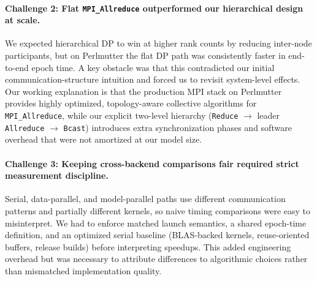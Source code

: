 \documentclass[11pt]{article}
\begin{document}
\paragraph{Challenge 2: Flat \texttt{MPI\_Allreduce} outperformed our hierarchical design at scale.}
We expected hierarchical DP to win at higher rank counts by reducing
inter-node participants, but on Perlmutter the flat DP path was consistently
faster in end-to-end epoch time. A key obstacle was that this contradicted our
initial communication-structure intuition and forced us to revisit system-level
effects. Our working explanation is that the production MPI stack on
Perlmutter provides highly optimized, topology-aware collective algorithms for
\texttt{MPI\_Allreduce}, while our explicit two-level hierarchy
(\texttt{Reduce} $\rightarrow$ leader \texttt{Allreduce} $\rightarrow$
\texttt{Bcast}) introduces extra synchronization phases and software overhead
that were not amortized at our model size.

\paragraph{Challenge 3: Keeping cross-backend comparisons fair required strict measurement discipline.}
Serial, data-parallel, and model-parallel paths use different communication
patterns and partially different kernels, so naive timing comparisons were easy
to misinterpret. We had to enforce matched launch semantics, a shared epoch-time
definition, and an optimized serial baseline (BLAS-backed kernels, reuse-oriented
buffers, release builds) before interpreting speedups. This added engineering
overhead but was necessary to attribute differences to algorithmic choices
rather than mismatched implementation quality.



%
\end{document}
